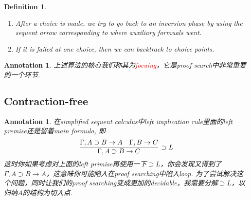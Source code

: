 \documentclass{article}
\theoremstyle{plain}
\newtheorem{definition}[theorem]{Definition}
\newtheorem{annotation}[theorem]{Annotation}
\theoremstyle{nonumberplain}
\newcommand{\redt}[1]{\textcolor{red}{#1}}
\begin{document}
\begin{definition}
\begin{enumerate}
\begin{enumerate}
	$$
	\begin{gathered}
	\begin{aligned}
	\infer[\vee R_1]{\Gamma^-;\cdot \xrightarrow{R} A \vee B}{\Gamma^-;\cdot \xrightarrow{R} A} &&&& \infer[\vee R_2]{\Gamma^-;\cdot \xrightarrow{R} A \vee B}{\Gamma^-;\cdot \xrightarrow{R} B} 
	\end{aligned}\\
	\infer[\supset L]{\Gamma^-, A \supset B;\cdot \xrightarrow{L} C^+}{\Gamma^-, A \supset B;\cdot \xrightarrow{L} A & \Gamma^-;B \xrightarrow{L} C^+}	
	\end{gathered}
	$$
		\item After a choice is made, we try to go back to an inversion phase by using the sequent arrow corresponding to where auxiliary formuals went.
		\item If it is failed at one choice, then we can backtrack to choice points. 
	\end{enumerate}
\end{enumerate}
\end{definition}

\begin{annotation}
\rm 上述算法的核心我们称其为\redt{focuing}，它是proof search中非常重要的一个环节. 
\end{annotation}


\newpage
\subsection{Contraction-free}

\begin{annotation}
\rm 在simplified sequent calculus中left implication rule里面的left premise还是留着main formula, 即
$$
\infer[\supset L]{\Gamma, A \supset B \to C}{\Gamma, A \supset B \to A & \Gamma, B \to C}
$$
这时你如果考虑对上面的left primise再使用一下$\supset L$，你会发现又得到了$\Gamma, A \supset B \to A$，这意味你可能陷入在proof searching中陷入loop. 为了尝试解决这个问题，同时让我们的proof searching变成更加的decidable，我需要分解$\supset L$，以归纳$A$的结构为切入点.
\end{annotation}
\end{document}
